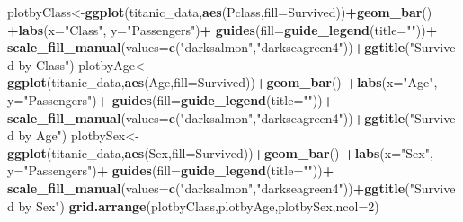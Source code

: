 \documentclass[]{article}
\newenvironment{Shaded}{\begin{snugshade}}{\end{snugshade}}
\newcommand{\DataTypeTok}[1]{\textcolor[rgb]{0.13,0.29,0.53}{#1}}
\newcommand{\DecValTok}[1]{\textcolor[rgb]{0.00,0.00,0.81}{#1}}
\newcommand{\KeywordTok}[1]{\textcolor[rgb]{0.13,0.29,0.53}{\textbf{#1}}}
\newcommand{\NormalTok}[1]{#1}
\newcommand{\OperatorTok}[1]{\textcolor[rgb]{0.81,0.36,0.00}{\textbf{#1}}}
\newcommand{\StringTok}[1]{\textcolor[rgb]{0.31,0.60,0.02}{#1}}
\begin{document}
\begin{Shaded}
\begin{Highlighting}[]
\NormalTok{plotbyClass<-}\KeywordTok{ggplot}\NormalTok{(titanic_data,}\KeywordTok{aes}\NormalTok{(Pclass,}\DataTypeTok{fill=}\NormalTok{Survived))}\OperatorTok{+}\KeywordTok{geom_bar}\NormalTok{() }\OperatorTok{+}\KeywordTok{labs}\NormalTok{(}\DataTypeTok{x=}\StringTok{"Class"}\NormalTok{, }\DataTypeTok{y=}\StringTok{"Passengers"}\NormalTok{)}\OperatorTok{+}\StringTok{ }\KeywordTok{guides}\NormalTok{(}\DataTypeTok{fill=}\KeywordTok{guide_legend}\NormalTok{(}\DataTypeTok{title=}\StringTok{""}\NormalTok{))}\OperatorTok{+}\StringTok{ }\KeywordTok{scale_fill_manual}\NormalTok{(}\DataTypeTok{values=}\KeywordTok{c}\NormalTok{(}\StringTok{"darksalmon"}\NormalTok{,}\StringTok{"darkseagreen4"}\NormalTok{))}\OperatorTok{+}\KeywordTok{ggtitle}\NormalTok{(}\StringTok{"Survived by Class"}\NormalTok{)}
\NormalTok{plotbyAge<-}\KeywordTok{ggplot}\NormalTok{(titanic_data,}\KeywordTok{aes}\NormalTok{(Age,}\DataTypeTok{fill=}\NormalTok{Survived))}\OperatorTok{+}\KeywordTok{geom_bar}\NormalTok{() }\OperatorTok{+}\KeywordTok{labs}\NormalTok{(}\DataTypeTok{x=}\StringTok{"Age"}\NormalTok{, }\DataTypeTok{y=}\StringTok{"Passengers"}\NormalTok{)}\OperatorTok{+}\StringTok{ }\KeywordTok{guides}\NormalTok{(}\DataTypeTok{fill=}\KeywordTok{guide_legend}\NormalTok{(}\DataTypeTok{title=}\StringTok{""}\NormalTok{))}\OperatorTok{+}\StringTok{ }\KeywordTok{scale_fill_manual}\NormalTok{(}\DataTypeTok{values=}\KeywordTok{c}\NormalTok{(}\StringTok{"darksalmon"}\NormalTok{,}\StringTok{"darkseagreen4"}\NormalTok{))}\OperatorTok{+}\KeywordTok{ggtitle}\NormalTok{(}\StringTok{"Survived by Age"}\NormalTok{)}
\NormalTok{plotbySex<-}\KeywordTok{ggplot}\NormalTok{(titanic_data,}\KeywordTok{aes}\NormalTok{(Sex,}\DataTypeTok{fill=}\NormalTok{Survived))}\OperatorTok{+}\KeywordTok{geom_bar}\NormalTok{() }\OperatorTok{+}\KeywordTok{labs}\NormalTok{(}\DataTypeTok{x=}\StringTok{"Sex"}\NormalTok{, }\DataTypeTok{y=}\StringTok{"Passengers"}\NormalTok{)}\OperatorTok{+}\StringTok{ }\KeywordTok{guides}\NormalTok{(}\DataTypeTok{fill=}\KeywordTok{guide_legend}\NormalTok{(}\DataTypeTok{title=}\StringTok{""}\NormalTok{))}\OperatorTok{+}\StringTok{ }\KeywordTok{scale_fill_manual}\NormalTok{(}\DataTypeTok{values=}\KeywordTok{c}\NormalTok{(}\StringTok{"darksalmon"}\NormalTok{,}\StringTok{"darkseagreen4"}\NormalTok{))}\OperatorTok{+}\KeywordTok{ggtitle}\NormalTok{(}\StringTok{"Survived by Sex"}\NormalTok{)}
\KeywordTok{grid.arrange}\NormalTok{(plotbyClass,plotbyAge,plotbySex,}\DataTypeTok{ncol=}\DecValTok{2}\NormalTok{)}
\end{Highlighting}
\end{Shaded}
\end{document}
